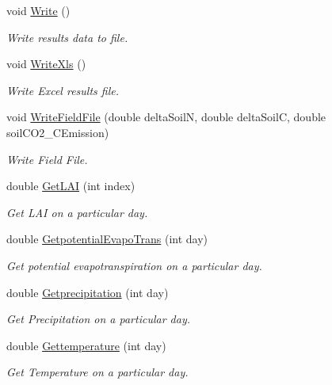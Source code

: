 \begin{DoxyCompactItemize}
void \mbox{\hyperlink{class_crop_class_adcbe888b5ffd4a000e7d45daece3fe84}{Write}} ()
\begin{DoxyCompactList}\small\item\em Write results data to file. \end{DoxyCompactList}\item 
\mbox{\label{class_crop_class_a9b6470304a1df61191f447da2692276c}} 
void \mbox{\hyperlink{class_crop_class_a9b6470304a1df61191f447da2692276c}{Write\+Xls}} ()
\begin{DoxyCompactList}\small\item\em Write Excel results file. \end{DoxyCompactList}\item 
void \mbox{\hyperlink{class_crop_class_a445f68063e9c6afd665b228c488b786b}{Write\+Field\+File}} (double delta\+SoilN, double delta\+SoilC, double soil\+C\+O2\+\_\+\+C\+Emission)
\begin{DoxyCompactList}\small\item\em Write Field File. \end{DoxyCompactList}\item 
double \mbox{\hyperlink{class_crop_class_ac921e5d0df8c03bb12ef9113cb27337d}{Get\+L\+AI}} (int index)
\begin{DoxyCompactList}\small\item\em Get L\+AI on a particular day. \end{DoxyCompactList}\item 
double \mbox{\hyperlink{class_crop_class_aaff60f42755eee618996358238af406f}{Getpotential\+Evapo\+Trans}} (int day)
\begin{DoxyCompactList}\small\item\em Get potential evapotranspiration on a particular day. \end{DoxyCompactList}\item 
double \mbox{\hyperlink{class_crop_class_a00394efec24c23157da2658408cc4271}{Getprecipitation}} (int day)
\begin{DoxyCompactList}\small\item\em Get Precipitation on a particular day. \end{DoxyCompactList}\item 
double \mbox{\hyperlink{class_crop_class_abf25b1d4e148fc959909d187693b20e1}{Gettemperature}} (int day)
\begin{DoxyCompactList}\small\item\em Get Temperature on a particular day. \end{DoxyCompactList}\item 

\end{DoxyCompactItemize}
